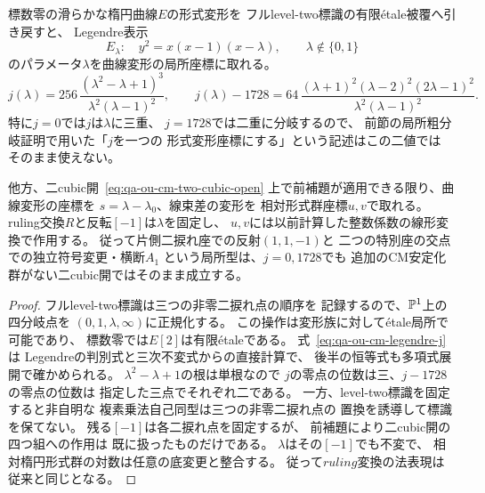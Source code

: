 \begin{lemma}
\label{lem:qa-ou-cm-level-two-deformation-coordinate}
標数零の滑らかな楕円曲線$E$の形式変形を
フルlevel-two標識の有限étale被覆へ引き戻すと、
Legendre表示
\[
 E_\lambda:\quad y^2=x(x-1)(x-\lambda),\qquad
 \lambda\notin\{0,1\}
\]
のパラメータ$\lambda$を曲線変形の局所座標に取れる。
\[
 j(\lambda)=
 256\,\frac{(\lambda^2-\lambda+1)^3}
              {\lambda^2(\lambda-1)^2},\qquad
 j(\lambda)-1728=
 64\,\frac{(\lambda+1)^2(\lambda-2)^2(2\lambda-1)^2}
           {\lambda^2(\lambda-1)^2}.
 \tag{CM-lambda}\label{eq:qa-ou-cm-legendre-j}
\]
特に$j=0$では$j$は$\lambda$に三重、
$j=1728$では二重に分岐するので、
前節の局所粗分岐証明で用いた「$j$を一つの
形式変形座標にする」という記述はこの二値では
そのまま使えない。

他方、二cubic開~\eqref{eq:qa-ou-cm-two-cubic-open}
上で前補題が適用できる限り、曲線変形の座標を
$s=\lambda-\lambda_0$、線束差の変形を
相対形式群座標$u,v$で取れる。
ruling交換$R$と反転$[-1]$は$\lambda$を固定し、
$u,v$には以前計算した整数係数の線形変換で作用する。
従って片側二捩れ座での反射$(1,1,-1)$と
二つの特別座の交点での独立符号変更・横断$A_1$
という局所型は、$j=0,1728$でも
追加のCM安定化群がない二cubic開ではそのまま成立する。
\end{lemma}
\begin{proof}
フルlevel-two標識は三つの非零二捩れ点の順序を
記録するので、$\mathbb P^1$上の四分岐点を
$(0,1,\lambda,\infty)$に正規化する。
この操作は変形族に対してétale局所で可能であり、
標数零では$E[2]$は有限étaleである。
式~\eqref{eq:qa-ou-cm-legendre-j}は
Legendreの判別式と三次不変式からの直接計算で、
後半の恒等式も多項式展開で確かめられる。
$\lambda^2-\lambda+1$の根は単根なので
$j$の零点の位数は三、$j-1728$の零点の位数は
指定した三点でそれぞれ二である。
一方、level-two標識を固定すると非自明な
複素乗法自己同型は三つの非零二捩れ点の
置換を誘導して標識を保てない。
残る$[-1]$は各二捩れ点を固定するが、
前補題により二cubic開の四つ組への作用は
既に扱ったものだけである。
$\lambda$はその$[-1]$でも不変で、
相対楕円形式群の対数は任意の底変更と整合する。
従って$ruling$変換の法表現は従来と同じとなる。
\end{proof}

